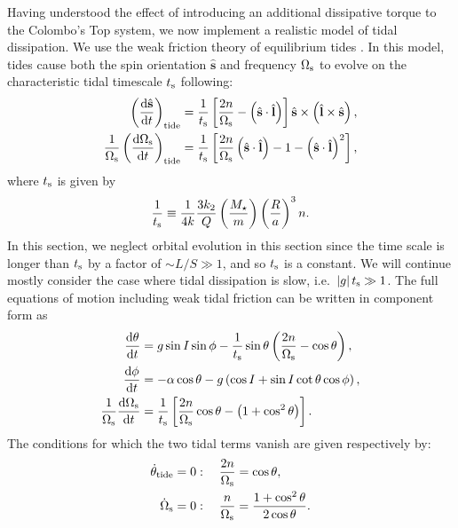 \documentclass[
        fleqn,
        usenatbib,
        referee,
    ]{mnras}
\newcommand*{\rd}[2]{\frac{\mathrm{d}#1}{\mathrm{d}#2}}
\newcommand*{\abs}[1]{\left|#1\right|}
\newcommand*{\p}[1]{\left(#1\right)}
\newcommand*{\s}[1]{\left[#1\right]}
\newcommand*{\uv}[1]{\hat{\boldsymbol{\mathbf{#1}}}}
\begin{document}
Having understood the effect of introducing an additional dissipative torque to
the Colombo's Top system, we now implement a realistic model of tidal
dissipation. We use the weak friction theory of equilibrium tides
\citep{lai2012}. In this model, tides cause both the spin orientation $\uv{s}$
and frequency $\Omega_{\rm s}$ to evolve on the characteristic tidal timescale
$t_{\rm s}$ following:
\begin{align}
    \p{\rd{\uv{s}}{t}}_{\rm tide} &= \frac{1}{t_{\rm s}}
                \s{\frac{2n}{\Omega_{\rm s}} - \p{\uv{s} \cdot \uv{l}}}
                    \uv{s} \times \p{\uv{l} \times \uv{s}}\label{eq:dsdt_tide},\\
    \frac{1}{\Omega_{\rm s}}\p{\rd{\Omega_{\rm s}}{t}}_{\rm tide}
        &= \frac{1}{t_{\rm s}} \s{\frac{2n}{\Omega_{\rm s}}\p{\uv{s} \cdot
            \uv{l}} - 1 - \p{\uv{s} \cdot \uv{l}}^2},\label{eq:dWsdt_tide}
\end{align}
where $t_{\rm s}$ is given by
\begin{equation}
    \frac{1}{t_{\rm s}} \equiv \frac{1}{4k}
        \frac{3k_2}{Q}\p{\frac{M_\star}{m}}\p{\frac{R}{a}}^3 n.
\end{equation}
In this section, we neglect orbital evolution in this section since the time
scale is longer than $t_{\rm s}$ by a factor of $\sim L / S \gg 1$, and so
$t_{\rm s}$ is a constant. We will continue mostly consider the case where tidal
dissipation is slow, i.e.\ $\abs{g}t_{\rm s} \gg 1$. The full equations of
motion including weak tidal friction can be written in component form as
\begin{align}
    \rd{\theta}{t} &= g\sin I \sin \phi -
        \frac{1}{t_{\rm s}}\sin \theta\p{\frac{2n}{\Omega_{\rm s}} - \cos \theta}
            ,\label{eq:ds_fullq}\\
    \rd{\phi}{t} &= -\alpha\cos\theta
        - g\p{\cos I + \sin I \cot \theta \cos \phi}\label{eq:ds_fullphi},\\
    \frac{1}{\Omega_{\rm s}}\rd{\Omega_{\rm s}}{t}
        &= \frac{1}{t_{\rm s}} \s{\frac{2n}{\Omega_{\rm s}} \cos \theta
            - \p{1 + \cos^2\theta}}\label{eq:ds_fulls}.
\end{align}
The conditions for which the two tidal terms vanish are given respectively by:
\begin{align}
    \dot{\theta}_{\rm tide} = 0 &: \quad \frac{2n}{\Omega_{\rm s}} = \cos \theta,
        \label{eq:weaktide_dqzero}\\
    \dot{\Omega}_{\rm s} = 0 &: \quad \frac{n}{\Omega_{\rm s}}
        = \frac{1 + \cos^2\theta}{2\cos \theta}.\label{eq:weaktide_dWszero}
\end{align}
\end{document}
